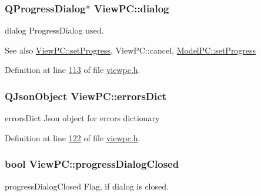 \subsubsection[{\texorpdfstring{dialog}{dialog}}]{\setlength{\rightskip}{0pt plus 5cm}Q\+Progress\+Dialog$\ast$ View\+P\+C\+::dialog}\hypertarget{class_view_p_c_a31abbb470fe329b44e6ffee202b903ca}{}\label{class_view_p_c_a31abbb470fe329b44e6ffee202b903ca}


dialog Progress\+Dialog used. 

\begin{DoxySeeAlso}{See also}
\hyperlink{class_view_p_c_a9c32a1fdb6ead84e5ada8fba8860c7ed}{View\+P\+C\+::set\+Progress}, View\+P\+C\+::cancel, \hyperlink{class_model_p_c_afdcd80f0ed5062e145a71f09b0897547}{Model\+P\+C\+::set\+Progress} 
\end{DoxySeeAlso}


Definition at line \hyperlink{viewpc_8h_source_l00113}{113} of file \hyperlink{viewpc_8h_source}{viewpc.\+h}.

\subsubsection[{\texorpdfstring{errors\+Dict}{errorsDict}}]{\setlength{\rightskip}{0pt plus 5cm}Q\+Json\+Object View\+P\+C\+::errors\+Dict}\hypertarget{class_view_p_c_a26f90436aca32e5bad46f5e69a7e7e09}{}\label{class_view_p_c_a26f90436aca32e5bad46f5e69a7e7e09}


errors\+Dict Json object for errors dictionary 



Definition at line \hyperlink{viewpc_8h_source_l00122}{122} of file \hyperlink{viewpc_8h_source}{viewpc.\+h}.

\subsubsection[{\texorpdfstring{progress\+Dialog\+Closed}{progressDialogClosed}}]{\setlength{\rightskip}{0pt plus 5cm}bool View\+P\+C\+::progress\+Dialog\+Closed}\hypertarget{class_view_p_c_add8c82aa2b0b934212aa5bde9277ab36}{}\label{class_view_p_c_add8c82aa2b0b934212aa5bde9277ab36}


progress\+Dialog\+Closed Flag, if dialog is closed. 

